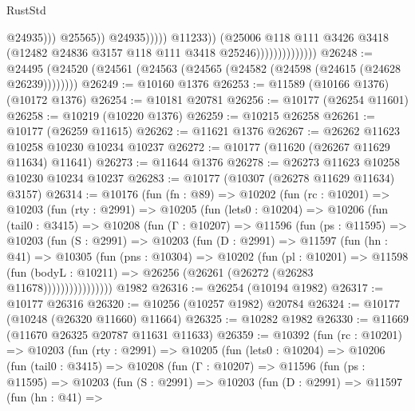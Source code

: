 \begin{lexlean}{RustStd}
\begin{coremodule}
                                                    @24935)))
                                              @25565))
                                          @24935)))))
                                @11233))
                            (@25006
                              @118
                              @111
                              @3426
                              @3418
                              (@12482 @24836 @3157 @118 @111 @3418 @25246))))))))))))))
@26248 := @24495 (@24520 (@24561 (@24563 (@24565 (@24582 (@24598 (@24615 (@24628 @26239))))))))
@26249 := @10160 @1376
@26253 := @11589 (@10166 @1376) (@10172 @1376)
@26254 := @10181 @20781
@26256 := @10177 (@26254 @11601)
@26258 := @10219 (@10220 @1376)
@26259 := @10215 @26258
@26261 := @10177 (@26259 @11615)
@26262 := @11621 @1376
@26267 := @26262 @11623 @10258 @10230 @10234 @10237
@26272 := @10177 (@11620 (@26267 @11629 @11634) @11641)
@26273 := @11644 @1376
@26278 := @26273 @11623 @10258 @10230 @10234 @10237
@26283 := @10177 (@10307 (@26278 @11629 @11634) @3157)
@26314 := @10176
    (fun (fn : @89) =>
    @10202
      (fun (rc : @10201) =>
      @10203
        (fun (rty : @2991) =>
        @10205
          (fun (lets0 : @10204) =>
          @10206
            (fun (tail0 : @3415) =>
            @10208
              (fun (Γ : @10207) =>
              @11596
                (fun (ps : @11595) =>
                @10203
                  (fun (S : @2991) =>
                  @10203
                    (fun (D : @2991) =>
                    @11597
                      (fun (hn : @41) =>
                      @10305
                        (fun (pns : @10304) =>
                        @10202
                          (fun (pl : @10201) =>
                          @11598
                            (fun (bodyL : @10211) =>
                            @26256 (@26261 (@26272 (@26283 @11678))))))))))))))))
    @1982
@26316 := @26254 (@10194 @1982)
@26317 := @10177 @26316
@26320 := @10256 (@10257 @1982) @20784
@26324 := @10177 (@10248 (@26320 @11660) @11664)
@26325 := @10282 @1982
@26330 := @11669 (@11670 @26325 @20787 @11631 @11633)
@26359 := @10392
    (fun (rc : @10201) =>
    @10203
      (fun (rty : @2991) =>
      @10205
        (fun (lets0 : @10204) =>
        @10206
          (fun (tail0 : @3415) =>
          @10208
            (fun (Γ : @10207) =>
            @11596
              (fun (ps : @11595) =>
              @10203
                (fun (S : @2991) =>
                @10203
                  (fun (D : @2991) =>
                  @11597
                    (fun (hn : @41) =>

\end{coremodule}
\end{lexlean}
